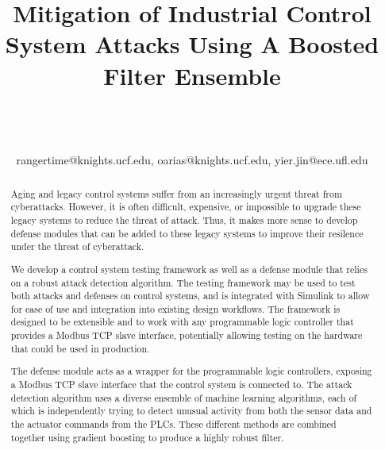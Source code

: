 \documentclass[10pt,twocolumn]{IEEEtran}
\begin{document}
\title{Mitigation of Industrial Control System Attacks Using A Boosted Filter Ensemble}

\author{\\
\\
\\
{rangertime@knights.ucf.edu, oarias@knights.ucf.edu, yier.jin@ece.ufl.edu}\vspace{-0.16in}\vspace{-0.2in}}

\maketitle
\pagestyle{empty}
\thispagestyle{empty}

\begin{abstract}
Aging and legacy control systems suffer from an increasingly urgent threat from cyberattacks.
However, it is often difficult, expensive, or impossible to upgrade these legacy systems to reduce the threat of attack.
Thus, it makes more sense to develop defense modules that can be added to these legacy systems to improve their resilence under the threat of cyberattack.

We develop a control system testing framework as well as a defense module that relies on a robust attack detection algorithm.
The testing framework may be used to test both attacks and defenses on control systems, and is integrated with Simulink to allow for ease of use and integration into existing design workflows.
The framework is designed to be extensible and to work with any programmable logic controller that provides a Modbus TCP slave interface, potentially allowing testing on the hardware that could be used in production.

The defense module acts as a wrapper for the programmable logic controllers, exposing a Modbus TCP slave interface that the control system is connected to.
The attack detection algorithm uses a diverse ensemble of machine learning algorithms, each of which is independently trying to detect unusual activity from both the sensor data and the actuator commands from the PLCs.
These different methods are combined together using gradient boosting to produce a highly robust filter.
\end{abstract}
\end{document}
